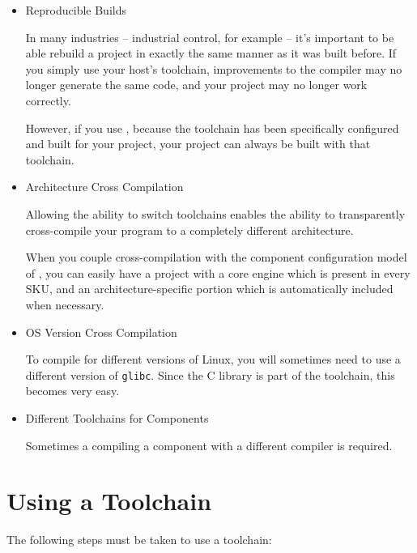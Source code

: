 \begin{itemize}
\item Reproducible Builds

  In many industries -- industrial control, for example -- it's
  important to be able rebuild a project in exactly the same manner
  as it was built before.  If you simply use your host's toolchain,
  improvements to the compiler may no longer generate the same code,
  and your project may no longer work correctly.

  However, if you use \lmsbw, because the toolchain has been
  specifically configured and built for your project, your project can
  always be built with that toolchain.

\item Architecture Cross Compilation

  Allowing the ability to switch toolchains enables the ability to
  transparently cross-compile your program to a completely different
  architecture.

  When you couple cross-compilation with the component configuration
  model of \lmsbw, you can easily have a project with a core engine
  which is present in every SKU, and an architecture-specific portion
  which is automatically included when necessary.

\item OS Version Cross Compilation

  To compile for different versions of Linux, you will sometimes need
  to use a different version of \texttt{glibc}.  Since the C library
  is part of the toolchain, this becomes very easy.

\item Different Toolchains for Components

  Sometimes a compiling a component with a different compiler is
  required.
\end{itemize}

\section{Using a Toolchain}

The following steps must be taken to use a toolchain:

